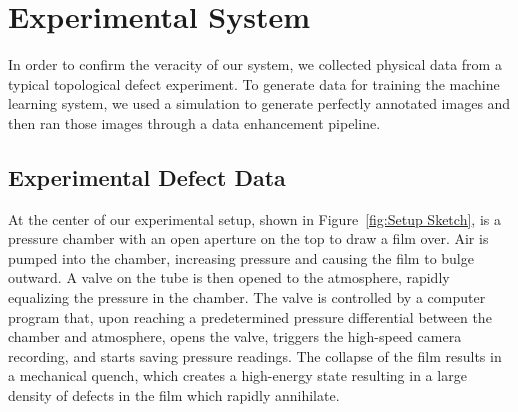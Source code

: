 \documentclass[twoside,twocolumn,9pt]{article}
\begin{document}
%

\section{Experimental System}


In order to confirm the veracity of our system, we collected physical data from a typical topological defect experiment.
To generate data for training the machine learning system, we used a simulation to generate perfectly annotated images and then ran those images through a data enhancement pipeline.




\subsection{Experimental Defect Data}

At the center of our experimental setup, shown in Figure~\ref{fig:Setup Sketch}, is a pressure chamber with an open aperture on the top to draw a film over. Air is pumped into the chamber, increasing pressure and causing the film to bulge outward. A valve on the tube is then opened to the atmosphere, rapidly equalizing the pressure in the chamber. The valve is controlled by a computer program that, upon reaching a predetermined pressure differential between the chamber and atmosphere, opens the valve, triggers the high-speed camera recording, and starts saving pressure readings.  The collapse of the film results in a mechanical quench, which creates a high-energy state resulting in a large density of defects in the film which rapidly annihilate.
\end{document}
